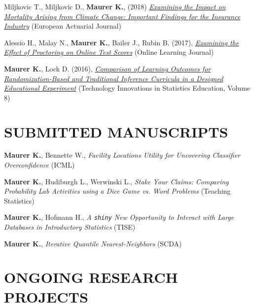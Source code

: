 \documentclass[margin, 10pt]{res}\usepackage[]{graphicx}\usepackage[]{color}
\begin{document}
\begin{resume}
Miljkovic T., Miljkovic D., \textbf{Maurer K.}, (2018) \href{https://link.springer.com/article/10.1007/s13385-018-0178-2}{\it Examining the Impact on Mortality Arising from Climate Change: Important Findings for the Insurance Industry} (European Actuarial Journal)

Alessio H., Malay N., \textbf{Maurer K.}, Bailer J., Rubin B. (2017), \href{https://olj.onlinelearningconsortium.org/index.php/olj/article/view/885}{{\it Examining the Effect of Proctoring on Online Test Scores}} (Online Learning Journal) 

\textbf{Maurer K.}, Lock D. (2016), \href{http://escholarship.org/uc/item/0wm523b0}{{\it Comparison of Learning Outcomes for Randomization-Based and Traditional Inference Curricula in a Designed Educational Experiment}} (Technology Innovations in Statistics Education, Volume 8)

  
  \section{SUBMITTED MANUSCRIPTS} 

\textbf{Maurer K.}, Bennette W., \textit{Facility Locations Utility for Uncovering Classifier Overconfidence} (ICML)

\textbf{Maurer K.}, Hudiburgh L., Werwinski L., \textit{Stake Your Claims: Comparing Probability Lab Activities using a Dice Game vs. Word Problems}  (Teaching Statistics)

\textbf{Maurer K.}, Hofmann H., {\it A \texttt{shiny} New Opportunity to Interact with Large Databases in Introductory Statistics} (TISE)

\textbf{Maurer K.}, {\it Iterative Quantile Nearest-Neighbors} (SCDA)



  
\section{ONGOING RESEARCH PROJECTS}


\end{resume}
\end{document}
